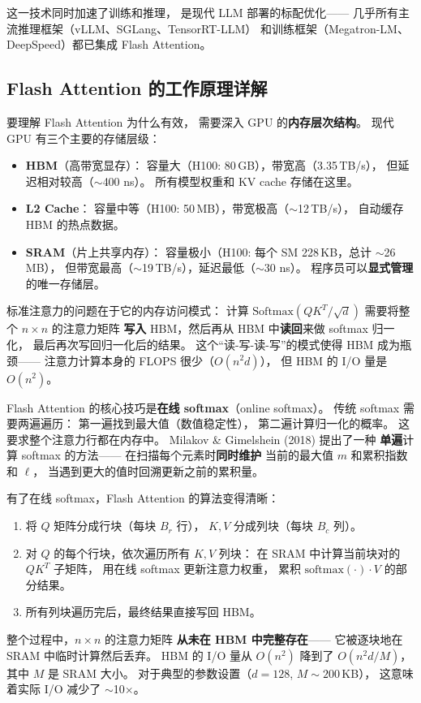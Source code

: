 这一技术同时加速了训练和推理，
是现代 LLM 部署的标配优化——
几乎所有主流推理框架（vLLM、SGLang、TensorRT-LLM）
和训练框架（Megatron-LM、DeepSpeed）都已集成 Flash Attention。

\subsection{Flash Attention 的工作原理详解}

要理解 Flash Attention 为什么有效，
需要深入 GPU 的\textbf{内存层次结构}。
现代 GPU 有三个主要的存储层级：
\begin{itemize}[noitemsep]
  \item \textbf{HBM}（高带宽显存）：
        容量大（H100: 80\,GB），带宽高（3.35\,TB/s），
        但延迟相对较高（$\sim$400 ns）。
        所有模型权重和 KV cache 存储在这里。
  \item \textbf{L2 Cache}：
        容量中等（H100: 50\,MB），带宽极高（$\sim$12\,TB/s），
        自动缓存 HBM 的热点数据。
  \item \textbf{SRAM}（片上共享内存）：
        容量极小（H100: 每个 SM 228\,KB，总计 $\sim$26\,MB），
        但带宽最高（$\sim$19\,TB/s），延迟最低（$\sim$30 ns）。
        程序员可以\textbf{显式管理}的唯一存储层。
\end{itemize}

标准注意力的问题在于它的内存访问模式：
计算 $\text{Softmax}(QK^T/\sqrt{d})$ 需要将整个 $n \times n$ 的注意力矩阵
\textbf{写入} HBM，然后再从 HBM 中\textbf{读回}来做 softmax 归一化，
最后再次写回归一化后的结果。
这个``读-写-读-写''的模式使得 HBM 成为瓶颈——
注意力计算本身的 FLOPS 很少（$O(n^2 d)$），
但 HBM 的 I/O 量是 $O(n^2)$。

Flash Attention 的核心技巧是\textbf{在线 softmax}（online softmax）。
传统 softmax 需要两遍遍历：
第一遍找到最大值（数值稳定性），
第二遍计算归一化的概率。
这要求整个注意力行都在内存中。
Milakov \& Gimelshein (2018) 提出了一种
\textbf{单遍}计算 softmax 的方法——
在扫描每个元素时\textbf{同时维护}
当前的最大值 $m$ 和累积指数和 $\ell$，
当遇到更大的值时回溯更新之前的累积量。

有了在线 softmax，Flash Attention 的算法变得清晰：
\begin{enumerate}[noitemsep]
  \item 将 $Q$ 矩阵分成行块（每块 $B_r$ 行），
        $K, V$ 分成列块（每块 $B_c$ 列）。
  \item 对 $Q$ 的每个行块，依次遍历所有 $K, V$ 列块：
        在 SRAM 中计算当前块对的 $QK^T$ 子矩阵，
        用在线 softmax 更新注意力权重，
        累积 $\text{softmax}(\cdot) \cdot V$ 的部分结果。
  \item 所有列块遍历完后，最终结果直接写回 HBM。
\end{enumerate}
整个过程中，$n \times n$ 的注意力矩阵
\textbf{从未在 HBM 中完整存在}——
它被逐块地在 SRAM 中临时计算然后丢弃。
HBM 的 I/O 量从 $O(n^2)$ 降到了 $O(n^2 d / M)$，
其中 $M$ 是 SRAM 大小。
对于典型的参数设置（$d = 128$, $M \sim 200$\,KB），
这意味着实际 I/O 减少了 $\sim$10$\times$。

